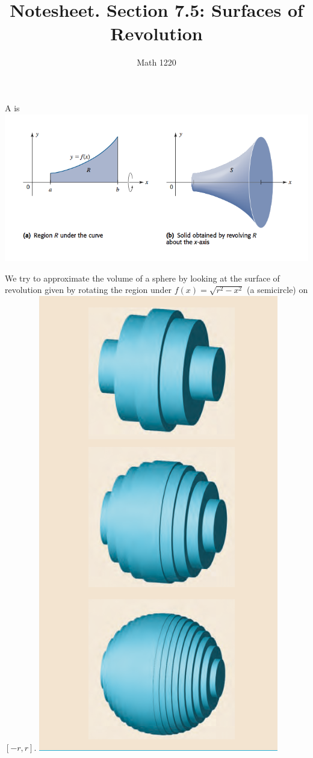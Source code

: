 \documentclass[12pt, a4paper]{article}
\author{Math 1220}
\title{Notesheet. Section 7.5: Surfaces of Revolution}
\date{}
\begin{document}
\maketitle
\nameline
\begin{defi}
  A  is \\
  
  \includegraphics[scale=0.5]{images/surface-of-revolution}
\end{defi}
\begin{ex}
  We try to approximate the volume of a sphere by looking at the
  surface of revolution given by rotating the region under \(f(x) =
  \sqrt{r^2-x^2}\) (a semicircle) on \([-r,r]\).
  \includegraphics[scale=0.3]{images/approximating-volume-of-sphere}
\end{ex}
\end{document}
